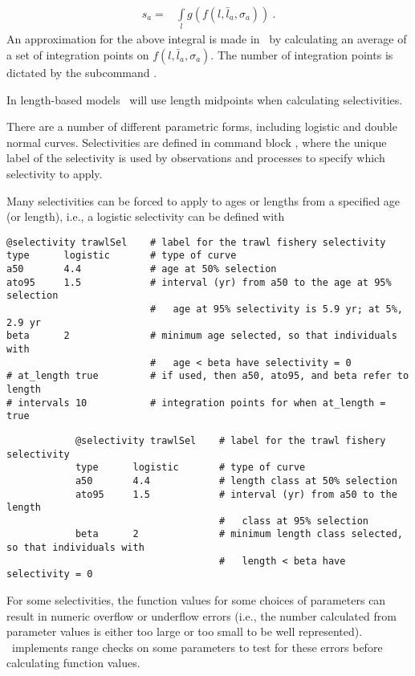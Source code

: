 \begin{align*}
	s_a = & \int\limits_l g(f(l,\bar{l}_a, \sigma_a)) \ .
\end{align*}
%
An approximation for the above integral is made in \CNAME\ by calculating an average of a set of integration points on \(f(l,\bar{l}_a, \sigma_a)\). The number of integration points is dictated by the subcommand .

\else
In length-based models \CNAME\ will use length midpoints when calculating selectivities. 
\fi %

There are a number of different parametric forms, including logistic and double normal curves. Selectivities are defined in command block , where the unique label of the selectivity is used by observations and processes to specify which selectivity to apply.

Many selectivities can be forced to apply to ages or lengths from a specified age (or length), i.e., a logistic selectivity 
 can be defined with

\ifAgeBased
{\small{\begin{verbatim}
@selectivity trawlSel    # label for the trawl fishery selectivity
type      logistic       # type of curve
a50       4.4            # age at 50% selection
ato95     1.5            # interval (yr) from a50 to the age at 95% selection
                         #   age at 95% selectivity is 5.9 yr; at 5%, 2.9 yr
beta      2              # minimum age selected, so that individuals with 
                         #   age < beta have selectivity = 0
# at_length true         # if used, then a50, ato95, and beta refer to length
# intervals 10			 # integration points for when at_length = true
\end{verbatim}}}
\else
{\small{\begin{verbatim}
			@selectivity trawlSel    # label for the trawl fishery selectivity
			type      logistic       # type of curve
			a50       4.4            # length class at 50% selection
			ato95     1.5            # interval (yr) from a50 to the length
			                         #   class at 95% selection
			beta      2              # minimum length class selected, so that individuals with 
			                         #   length < beta have selectivity = 0
\end{verbatim}}}
\fi

For some selectivities, the function values for some choices of parameters can result in numeric overflow or underflow errors (i.e., the number calculated from parameter values is either too large or too small to be well represented). \CNAME\ implements range checks on some parameters to test for these errors before calculating function values.

